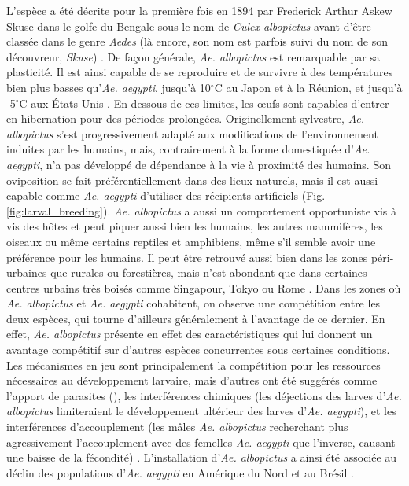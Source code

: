 L'espèce a été décrite pour la première fois en 1894 par Frederick Arthur Askew Skuse dans le golfe du Bengale sous le nom de {\em Culex albopictus} avant d'être classée dans le genre {\em Aedes} (là encore, son nom est parfois suivi du nom de son découvreur, {\em Skuse}) \cite{skuse1894banded}. 
De façon générale, {\em Ae. albopictus} est remarquable par sa plasticité. 
Il est ainsi capable de se reproduire et de survivre à des températures bien plus basses qu'{\em Ae. aegypti}, jusqu'à 10$^\circ$C au Japon et à la Réunion, et jusqu'à -5$^\circ$C aux États-Unis \cite{paupy2009aedes}. 
En dessous de ces limites, les \oe ufs sont capables d'entrer en hibernation pour des périodes prolongées.
Originellement sylvestre, {\em Ae. albopictus} s'est progressivement adapté aux modifications de l'environnement induites par les humains, mais, contrairement à la forme domestiquée d'{\em Ae. aegypti}, n'a pas développé de dépendance à la vie à proximité des humains.
Son oviposition se fait préférentiellement dans des lieux naturels, mais il est aussi capable comme {\em Ae. aegypti} d'utiliser des récipients artificiels (Fig. \ref{fig:larval_breeding}).
{\em Ae. albopictus} a aussi un comportement opportuniste vis à vis des hôtes et peut piquer aussi bien les humains, les autres mammifères, les oiseaux ou même certains reptiles et amphibiens, même s'il semble avoir une préférence pour les humains.
Il peut être retrouvé aussi bien dans les zones péri-urbaines que rurales ou forestières, mais n'est abondant que dans certaines centres urbains très boisés comme Singapour, Tokyo ou Rome \cite{paupy2009aedes}.
Dans les zones où {\em Ae. albopictus} et {\em Ae. aegypti} cohabitent, on observe une compétition entre les deux espèces, qui tourne d'ailleurs généralement à l'avantage de ce dernier.
En effet, {\em Ae. albopictus} présente en effet des caractéristiques qui lui donnent un avantage compétitif sur d'autres espèces concurrentes sous certaines conditions.
Les mécanismes en jeu sont principalement la compétition pour les ressources nécessaires au développement larvaire, mais d'autres ont été suggérés comme l'apport de parasites (), les interférences chimiques (les déjections des larves d'{\em Ae. albopictus} limiteraient le développement ultérieur des larves d'{\em Ae. aegypti}), et les interférences d'accouplement (les mâles {\em Ae. albopictus} recherchant plus agressivement l'accouplement avec des femelles {\em Ae. aegypti} que l'inverse, causant une baisse de la fécondité) \cite{juliano2005ecology}.
L'installation d'{\em Ae. albopictus} a ainsi été associée au déclin des populations d'{\em Ae. aegypti} en Amérique du Nord et au Brésil \cite{paupy2009aedes}.



